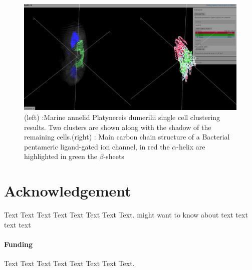 \documentclass{bioinfo}
\begin{document}
\begin{figure}[h!]%
\centerline{\includegraphics[totalheight=0.2\textheight]{fig1.png}}
\caption{(left) :Marine annelid Platynereis dumerilii single cell clustering results. Two clusters are shown along with the shadow of the remaining cells.(right) : Main carbon chain structure of a Bacterial pentameric ligand-gated ion channel, in red the $\alpha$-helix are highlighted in green the $\beta$-sheets}\label{fig:01}
\end{figure}



\section*{Acknowledgement}
Text Text Text Text Text Text  Text Text.  \citealp{Boffelli03} might want to know about  text text text text

\paragraph{Funding\textcolon} Text Text Text Text Text Text  Text Text.

%
%
%
%
%
%
%
%
%
\end{document}
